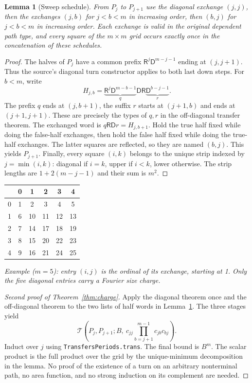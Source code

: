 \documentclass[11pt]{article}
\newtheorem{lemma}[theorem]{Lemma}
\newcommand{\R}{\mathsf R}
\newcommand{\Dn}{\mathsf D}
\newcommand{\Tr}{\mathcal T}
\newcommand{\code}[1]{\texttt{#1}}
\begin{document}
\begin{lemma}[Sweep schedule]\label{lem:sched}
From $P_j$ to $P_{j+1}$ use the diagonal exchange $(j,j)$, then the exchanges $(j,b)$ for $j<b<m$ in increasing order, then $(b,j)$ for $j<b<m$ in increasing order. Each exchange is valid in the original dependent path type, and every square of the $m\times m$ grid occurs exactly once in the concatenation of these schedules.
\end{lemma}
\begin{proof}
The halves of $P_j$ have a common prefix $\R^j\Dn^{m-j-1}$ ending at $(j,j+1)$. Thus the source's diagonal turn constructor applies to both last down steps. For $b<m$, write
\[
 H_{j,b}=\underbrace{\R^j\Dn^{m-b-1}}_{q}
 \Dn\R\underbrace{\Dn^{b-j-1}}_{r}.
\]
The prefix $q$ ends at $(j,b+1)$, the suffix $r$ starts at $(j+1,b)$ and ends at $(j+1,j+1)$. These are precisely the types of $q,r$ in the off-diagonal transfer theorem. The exchanged word is $q\R\Dn r=H_{j,b+1}$. Hold the true half fixed while doing the false-half exchanges, then hold the false half fixed while doing the true-half exchanges. The latter squares are reflected, so they are named $(b,j)$. This yields $P_{j+1}$. Finally, every square $(i,k)$ belongs to the unique strip indexed by $j=\min(i,k)$: diagonal if $i=k$, upper if $i<k$, lower otherwise. The strip lengths are $1+2(m-j-1)$ and their sum is $m^2$.
\end{proof}

\begin{center}
\begin{tabular}{c|ccccc}
 &0&1&2&3&4\\\midrule
0&1&2&3&4&5\\
1&6&10&11&12&13\\
2&7&14&17&18&19\\
3&8&15&20&22&23\\
4&9&16&21&24&25
\end{tabular}
\end{center}
\noindent\textit{Example ($m=5$): entry $(i,j)$ is the ordinal of its exchange, starting at 1. Only the five diagonal entries carry a Fourier size charge.}

\begin{proof}[Second proof of Theorem~\ref{thm:charge}]
Apply the diagonal theorem once and the off-diagonal theorem to the two lists of half words in Lemma~\ref{lem:sched}. The three stages yield
\[
 \Tr(P_j,P_{j+1};B,\ c_{jj}\prod_{b=j+1}^{m-1}c_{jb}c_{bj}).
\]
Induct over $j$ using \code{TransfersPeriods.trans}. The final bound is $B^m$. The scalar product is the full product over the grid by the unique-minimum decomposition in the lemma. No proof of the existence of a turn on an arbitrary nonterminal path, no area function, and no strong induction on its complement are needed.
\end{proof}
\end{document}
